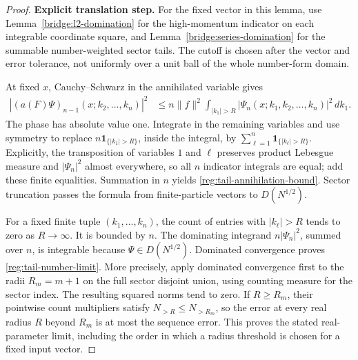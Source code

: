 \documentclass[11pt,a4paper]{article}
\theoremstyle{definition}
\theoremstyle{remark}
\begin{document}
\begin{proof}
\noindent\textbf{Explicit translation step.} For the fixed vector in this lemma, use
Lemma~\ref{bridge:l2-domination} for the high-momentum indicator on each
integrable coordinate square, and Lemma~\ref{bridge:series-domination}
for the summable number-weighted sector tails. The cutoff is chosen
after the vector and error tolerance, not uniformly over a unit ball
of the whole number-form domain.

At fixed \(x\), Cauchy--Schwarz in the annihilated variable gives
\begin{align*}
 |(a(F)\Psi)_{n-1}(x;k_2,\ldots,k_n)|^2
 &\leq n\|f\|^2\int_{|k_1|>R}
      |\Psi_n(x;k_1,k_2,\ldots,k_n)|^2\,dk_1.
\end{align*}
The phase has absolute value one.  Integrate in the remaining variables
and use symmetry to replace \(n\mathbf1_{\{|k_1|>R\}}\), inside the
integral, by \(\sum_{\ell=1}^n\mathbf1_{\{|k_\ell|>R\}}\).
Explicitly, the transposition of variables \(1\) and \(\ell\)
preserves product Lebesgue measure and \(|\Psi_n|^2\) almost
everywhere, so all \(n\) indicator integrals are equal; add these
finite equalities. Summation in \(n\) yields \eqref{reg:tail-annihilation-bound}.  Sector truncation
passes the formula from finite-particle vectors to \(D(N^{1/2})\).

For a fixed finite tuple \((k_1,\ldots,k_n)\), the count of entries with
\(|k_\ell|>R\) tends to zero as \(R\to\infty\).  It is bounded by \(n\).
The dominating integrand \(n|\Psi_n|^2\), summed over \(n\), is integrable
because \(\Psi\in D(N^{1/2})\).  Dominated convergence proves
\eqref{reg:tail-number-limit}.
More precisely, apply dominated convergence first to the radii
$R_m=m+1$ on the full sector disjoint union, using counting
measure for the sector index. The resulting squared norms tend
to zero. If $R\geq R_m$, their pointwise count multipliers
satisfy $N_{>R}\leq N_{>R_m}$, so the error at every real
radius $R$ beyond $R_m$ is at most the sequence error. This
proves the stated real-parameter limit, including the order in
which a radius threshold is chosen for a fixed input vector.
\end{proof}
\end{document}
